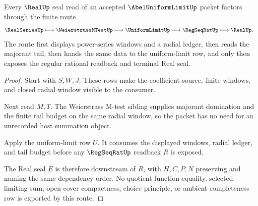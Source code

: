 \begin{theorem}
\label{thm:abel-uniform-limit-real-seal-route}
Every $\RealUp$ seal read of an accepted $\AbelUniformLimitUp$ packet factors through the finite route
$$
\RealSeriesUp \longmapsto \WeierstrassMTestUp \longmapsto \UniformLimitUp \longmapsto \RegSeqRatUp \longmapsto \RealUp .
$$
The route first displays power-series windows and a radial ledger, then reads the majorant tail, then hands the same data to the uniform-limit row, and only then exposes the regular rational readback and terminal Real seal.
\end{theorem}
\begin{proof}
Start with $S,W,J$. These rows make the coefficient source, finite windows, and closed radial window visible to the consumer.

Next read $M,T$. The Weierstrass M-test sibling supplies majorant domination and the finite tail budget on the same radial window, so the packet has no need for an unrecorded host summation object.

Apply the uniform-limit row $U$. It consumes the displayed windows, radial ledger, and tail budget before any $\RegSeqRatUp$ readback $R$ is exposed.

The Real seal $E$ is therefore downstream of $R$, with $H,C,P,N$ preserving and naming the same dependency order. No quotient function equality, selected limiting sum, open-cover compactness, choice principle, or ambient completeness row is exported by this route.
\end{proof}




